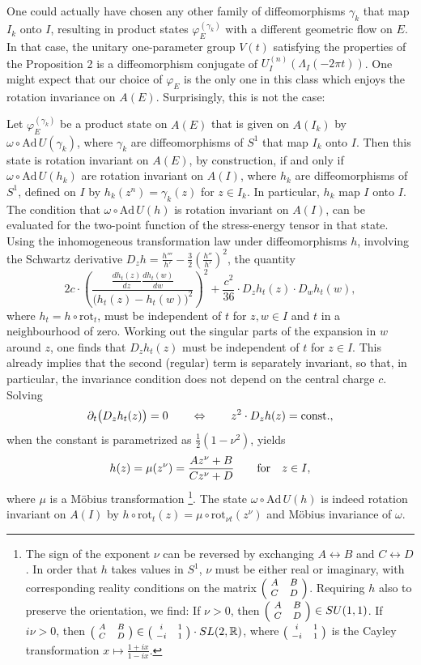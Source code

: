 \documentclass[12pt]{article}
\def \RR {{\mathbb R}}
\def\const{\mathrm{const.}}
\def\Ad{\mathrm{Ad}\,}
\def\rot{\mathrm{rot}}
\def\be{\begin{equation}} \def\bea{\begin{eqnarray}}
\def\ba{\begin{array}} \def\eea{\end{eqnarray}}
\def\ee{\end{equation}}\def\ea{\end{array}}
\newcommand{\dd}[2]{\frac{d{#2}}{d{#1}}}
\newcommand{\qbox}[1]{\quad\hbox{#1}\quad}
\begin{document}
One could actually have chosen any other family of diffeomorphisms
$\gamma_k$ that map $I_k$ onto $I$, resulting in product states
$\varphi_E^{(\gamma_k)}$ with a different geometric flow on $E$. In that
case, the unitary one-parameter group $V(t)$ satisfying the properties
of the Proposition 2 is a diffeomorphism conjugate of
$U^{(n)}_I(\Lambda_I(-2\pi t))$. One might expect that our choice of
$\varphi_E$ is the only one in this class which enjoys the rotation
invariance on $A(E)$. Surprisingly, this is not the case: 

Let $\varphi_E^{(\gamma_k)}$ be a product state on $A(E)$ that is
given on $A(I_k)$ by $\omega\circ\Ad{U(\gamma_k)}$, where $\gamma_k$
are diffeomorphisms of $S^1$ that map $I_k$ onto $I$. Then this state 
is rotation invariant on $A(E)$, by construction, if and only if
$\omega\circ\Ad U(h_k)$ are rotation invariant on $A(I)$, where $h_k$
are diffeomorphisms of $S^1$, defined on $I$ by $h_k(z^n)=\gamma_k(z)$
for $z\in I_k$. In particular, $h_k$ map $I$ onto $I$. The condition
that $\omega\circ\Ad U(h)$ is rotation invariant on $A(I)$, can be 
evaluated for the two-point function of the stress-energy tensor in
that state. Using the inhomogeneous transformation law under
diffeomorphisms $h$, involving the Schwartz derivative $D_zh =
\frac{h'''}{h'} - \frac32(\frac{h''}{h'})^2$, the quantity 
\be
\label{rotinv}
  2c\cdot \left(\frac{\dd z{h_t(z)}\dd
      w{h_t(w)}}{\big(h_t(z)-h_t(w)\big)^2}\right)^2 +
  \frac{c^2}{36} \cdot D_zh_t(z) \cdot D_wh_t(w), 
\ee
where $h_t=h\circ\rot_t$, 
must be independent of $t$ for $z,w\in I$ and $t$ in a neighbourhood
of zero. Working out the singular parts of the expansion in
$w$ around $z$, one finds that $D_zh_t(z)$ must be independent of
$t$ for $z\in I$. This already implies that the second (regular) term
is separately invariant, so that, in particular, the invariance
condition does not depend on the central charge $c$. Solving 
\be
\label{schwartz}
\partial_t\big(D_zh_t(z)\big)=0 \qquad\LRA\qquad  z^2\cdot D_zh(z) =
\const, \ee
when the constant is parametrized as $\frac 12(1-\nu^2)$, 
yields
\be
\label{nu-sol}
   h(z) =\mu(z^\nu) = \frac{Az^\nu+B}{Cz^\nu+D} \quad\qbox{for} z\in I,
\ee
where $\mu$ is a Möbius transformation%
\footnote{The sign of the exponent $\nu$ can be reversed by exchanging
  $A\leftrightarrow B$ and $C\leftrightarrow D$. In order that $h$
  takes values in $S^1$, $\nu$ must be either real or imaginary, with 
  corresponding reality conditions on the matrix
  $\footnotesize{\Big(\!\ba{cc}A&B\\C&D\ea\!\Big)}$. Requiring $h$ also
  to preserve the orientation, we find: If $\nu>0$, then 
  $\footnotesize{\Big(\!\ba{cc}A&B\\C&D\ea\!\Big)}\in SU(1,1)$. If  
  $i\nu>0$, then $\scriptsize{\Big(\!\ba{cc}A&B\\C&D\ea\!\Big)}\in
  \scriptsize{\Big(\!\ba{cc}i&1\\-i&1\ea\!\Big)}\cdot SL(2,\RR)$,
  where $\scriptsize{\Big(\!\ba{cc}i&1\\-i&1\ea\!\Big)}$ 
  is the Cayley transformation $x\mapsto \frac{1+ix}{1-ix}$.}. The
state $\omega\circ \Ad U(h)$ is indeed rotation invariant on $A(I)$ by
$h\circ\rot_t(z) = \mu\circ \rot_{\nu t} (z^\nu)$ and Möbius
invariance of $\omega$. 
 
\end{document}

